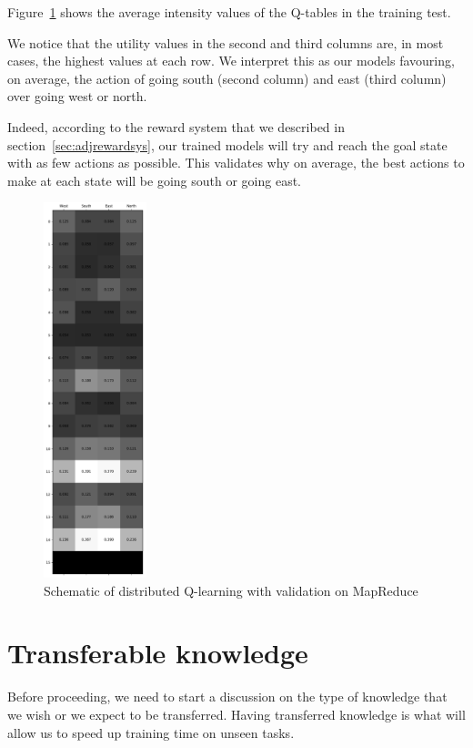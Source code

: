 Figure~\ref{fig:Qvalues} shows the average intensity values of the Q-tables in the training test.

We notice that the utility values in the second and third columns are, in most cases, the highest values at each row. We interpret this as our models favouring, on average, the action of going south (second column) and east (third column) over going west or north.

Indeed, according to the reward system that we described in section~\ref{sec:adjrewardsys}, our trained models will try and reach the goal state with as few actions as possible. This validates why on average, the best actions to make at each state will be going south or going east.

\begin{figure}
\centering
\includegraphics[width=3cm]{Figures/Qtable_mean}
\caption{Schematic of distributed Q-learning with validation on MapReduce}
\label{fig:Qvalues}
\end{figure}

\section{Transferable knowledge}
\label{sec:transferableknowledge}
Before proceeding, we need to start a discussion on the type of knowledge that we wish or we expect to be transferred. Having transferred knowledge is what will allow us to speed up training time on unseen tasks.

